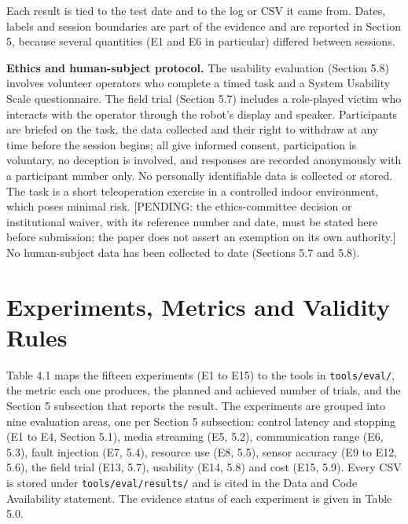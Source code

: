Each result is tied to the test date and to the log or CSV it came from. Dates, labels and session boundaries are part of the evidence and are reported in Section 5, because several quantities (E1 and E6 in particular) differed between sessions.

\textbf{Ethics and human-subject protocol.} The usability evaluation (Section 5.8) involves volunteer operators who complete a timed task and a System Usability Scale questionnaire. The field trial (Section 5.7) includes a role-played victim who interacts with the operator through the robot's display and speaker. Participants are briefed on the task, the data collected and their right to withdraw at any time before the session begins; all give informed consent, participation is voluntary, no deception is involved, and responses are recorded anonymously with a participant number only. No personally identifiable data is collected or stored. The task is a short teleoperation exercise in a controlled indoor environment, which poses minimal risk. [PENDING: the ethics-committee decision or institutional waiver, with its reference number and date, must be stated here before submission; the paper does not assert an exemption on its own authority.] No human-subject data has been collected to date (Sections 5.7 and 5.8).

\section{Experiments, Metrics and Validity Rules}

Table 4.1 maps the fifteen experiments (E1 to E15) to the tools in \texttt{tools/eval/}, the metric each one produces, the planned and achieved number of trials, and the Section 5 subsection that reports the result. The experiments are grouped into nine evaluation areas, one per Section 5 subsection: control latency and stopping (E1 to E4, Section 5.1), media streaming (E5, 5.2), communication range (E6, 5.3), fault injection (E7, 5.4), resource use (E8, 5.5), sensor accuracy (E9 to E12, 5.6), the field trial (E13, 5.7), usability (E14, 5.8) and cost (E15, 5.9). Every CSV is stored under \texttt{tools/eval/results/} and is cited in the Data and Code Availability statement. The evidence status of each experiment is given in Table 5.0.

